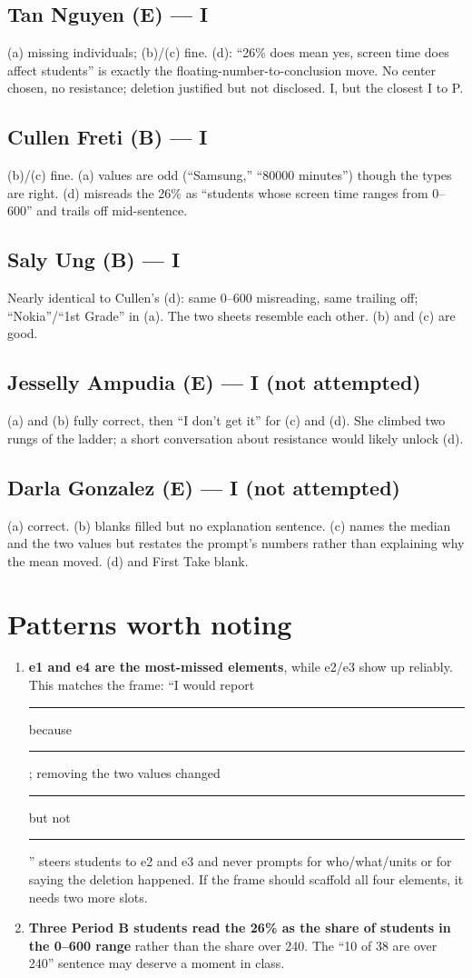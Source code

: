 \documentclass[11pt,letterpaper]{article}
\newcommand{\score}[1]{\textbf{#1}}
\begin{document}
\subsection{Tan Nguyen (E) --- \score{I}}
(a) missing individuals; (b)/(c) fine. (d): ``26\% does mean yes, screen time does affect students'' is exactly the floating-number-to-conclusion move. No center chosen, no resistance; deletion justified but not disclosed. I, but the closest I to P.

\subsection{Cullen Freti (B) --- \score{I}}
(b)/(c) fine. (a) values are odd (``Samsung,'' ``80000 minutes'') though the types are right. (d) misreads the 26\% as ``students whose screen time ranges from 0--600'' and trails off mid-sentence.

\subsection{Saly Ung (B) --- \score{I}}
Nearly identical to Cullen's (d): same 0--600 misreading, same trailing off; ``Nokia''/``1st Grade'' in (a). The two sheets resemble each other. (b) and (c) are good.

\subsection{Jesselly Ampudia (E) --- \score{I} (not attempted)}
(a) and (b) fully correct, then ``I don't get it'' for (c) and (d). She climbed two rungs of the ladder; a short conversation about resistance would likely unlock (d).

\subsection{Darla Gonzalez (E) --- \score{I} (not attempted)}
(a) correct. (b) blanks filled but no explanation sentence. (c) names the median and the two values but restates the prompt's numbers rather than explaining why the mean moved. (d) and First Take blank.

\section{Patterns worth noting}

\begin{enumerate}[leftmargin=*]
  \item \textbf{e1 and e4 are the most-missed elements}, while e2/e3 show up reliably. This matches the frame: ``I would report \rule{1cm}{0.4pt} because \rule{1cm}{0.4pt}; removing the two values changed \rule{1cm}{0.4pt} but not \rule{1cm}{0.4pt}'' steers students to e2 and e3 and never prompts for who/what/units or for saying the deletion happened. If the frame should scaffold all four elements, it needs two more slots.
  \item \textbf{Three Period B students read the 26\% as the share of students in the 0--600 range} rather than the share over 240. The ``10 of 38 are over 240'' sentence may deserve a moment in class.
\end{enumerate}
\end{document}
